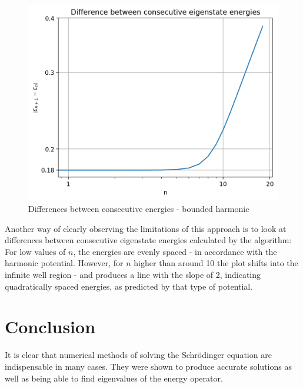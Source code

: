 \documentclass[11pt]{article}
\begin{document}
\begin{figure}
  \centering
  \vspace{-.3cm}
  \includegraphics[width=\linewidth]{diff_energies.png}
  \captionsetup{width=0.8\linewidth}
  \vspace{-.6cm}
  \caption{Differences between consecutive energies - bounded harmonic}
\end{figure}

\vspace{.5cm}

Another way of clearly observing the limitations of this approach
is to look at differences between
consecutive eigenstate energies calculated by the algorithm: 
For low values of $n$, the energies are evenly spaced - in accordance with the 
harmonic potential. However, for $n$ higher than around 10 the plot shifts into the
infinite well region - and produces a line with the slope of 2,
indicating quadratically spaced energies, as predicted by
that type of potential.

\vspace{1.3cm}

\section{Conclusion}

It is clear that numerical methods of solving the Schr{\"o}dinger
equation are indispensable in many cases. They were shown to produce
accurate solutions as well as being able to find eigenvalues of the
energy operator.
\end{document}
